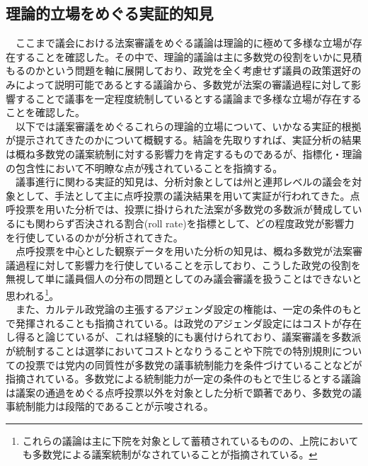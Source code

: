 \documentclass{article}
\begin{document}
\subsection{理論的立場をめぐる実証的知見}
　ここまで議会における法案審議をめぐる議論は理論的に極めて多様な立場が存在することを確認した。その中で、理論的議論は主に多数党の役割をいかに見積もるのかという問題を軸に展開しており、政党を全く考慮せず議員の政策選好のみによって説明可能であるとする議論\citep*{Krehbiel1998-ob,Krehbiel2010-ob}から、多数党が法案の審議過程に対して影響することで議事を一定程度統制しているとする議論\citep*{Aldrich1995-xf,Cox2005-pn,Cox2007-xq}まで多様な立場が存在することを確認した。\\
　以下では議案審議をめぐるこれらの理論的立場について、いかなる実証的根拠が提示されてきたのかについて概観する。結論を先取りすれば、実証分析の結果は概ね多数党の議案統制に対する影響力を肯定するものであるが、指標化・理論の包含性において不明瞭な点が残されていることを指摘する。\\
　議事進行に関わる実証的知見は、分析対象としては州と連邦レベルの議会を対象として、手法として主に点呼投票の議決結果を用いて実証が行われてきた。点呼投票を用いた分析では、投票に掛けられた法案が多数党の多数派が賛成しているにも関わらず否決される割合(roll rate)を指標として、どの程度政党が影響力を行使しているのかが分析されてきた。\citep{Magleby2018-rc,Richman2020-al}\\
　点呼投票を中心とした観察データを用いた分析の知見は、概ね多数党が法案審議過程に対して影響力を行使していることを示しており\citep*{Cox2001-eu,Lawrence2006-ed,Cox2010-gb,Meagher2012-to,Clark2012-lk}、こうした政党の役割を無視して単に議員個人の分布の問題としてのみ議会審議を扱うことはできないと思われる\footnote{これらの議論は主に下院を対象として蓄積されているものの、上院においても多数党による議案統制がなされていることが指摘されている。\citep*{Gailmard2007-yj,Hartog2008-xs}}。\\
　また、カルテル政党論の主張するアジェンダ設定の権能は、一定の条件のもとで発揮されることも指摘されている。\citet*[Ch6]{Cox2005-pn}は政党のアジェンダ設定にはコストが存在し得ると論じているが、これは経験的にも裏付けられており、議案審議を多数派が統制することは選挙においてコストとなりうること\citep*{Richman2015-xo}や下院での特別規則についての投票では党内の同質性が多数党の議事統制能力を条件づけていること\citep*{Finocchiaro2008-zh}などが指摘されている。多数党による統制能力が一定の条件のもとで生じるとする議論は議案の通過をめぐる点呼投票以外を対象とした分析で顕著であり、多数党の議事統制能力は段階的であることが示唆される。\\
\end{document}
